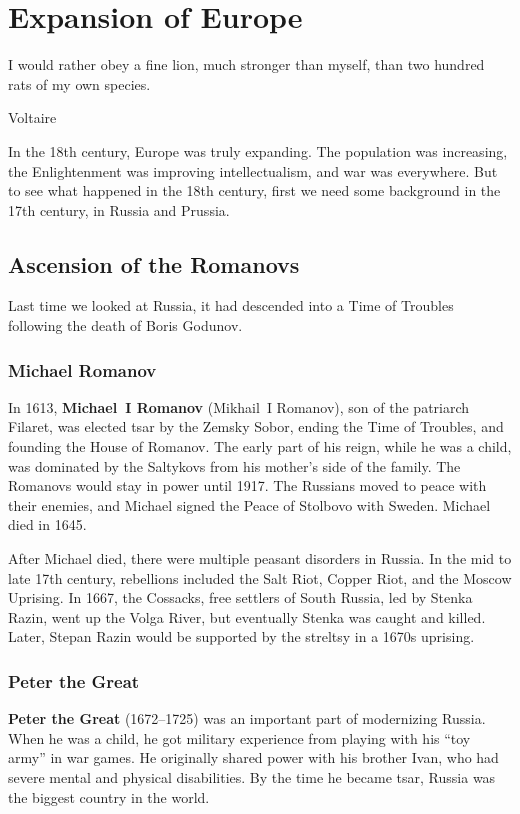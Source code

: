 \chapter{Expansion of Europe}

\epigraph{%
  I would rather obey a fine lion, much stronger than myself, than two hundred rats of my own species.
}{Voltaire}

In the 18th century, Europe was truly expanding.
The population was increasing, the Enlightenment was improving intellectualism, and war was everywhere.
But to see what happened in the 18th century, first we need some background in the 17th century,
in Russia and Prussia.

\section{Ascension of the Romanovs}

Last time we looked at Russia, it had descended into a Time of Troubles following the death of Boris Godunov.

\subsection*{Michael Romanov}

In 1613, \textbf{Michael~I Romanov} (Mikhail~I Romanov), son of the patriarch Filaret,
was elected tsar by the Zemsky Sobor, ending the Time of Troubles,
and founding the House of Romanov.
The early part of his reign, while he was a child,
was dominated by the Saltykovs from his mother's side of the family.
The Romanovs would stay in power until 1917.
The Russians moved to peace with their enemies, and Michael signed the Peace of Stolbovo with Sweden.
Michael died in 1645.

After Michael died, there were multiple peasant disorders in Russia.
In the mid to late 17th century, rebellions included the
Salt Riot, Copper Riot, and the Moscow Uprising.
In 1667, the Cossacks, free settlers of South Russia, led by Stenka Razin,
went up the Volga River, but eventually Stenka was caught and killed.
Later, Stepan Razin would be supported by the streltsy in a 1670s uprising.

\subsection*{Peter the Great}

\textbf{Peter the Great} (1672--1725) was an important part of modernizing Russia.
When he was a child, he got military experience from playing with his ``toy army'' in war games.
He originally shared power with his brother Ivan, who had severe mental and physical disabilities.
By the time he became tsar, Russia was the biggest country in the world.

